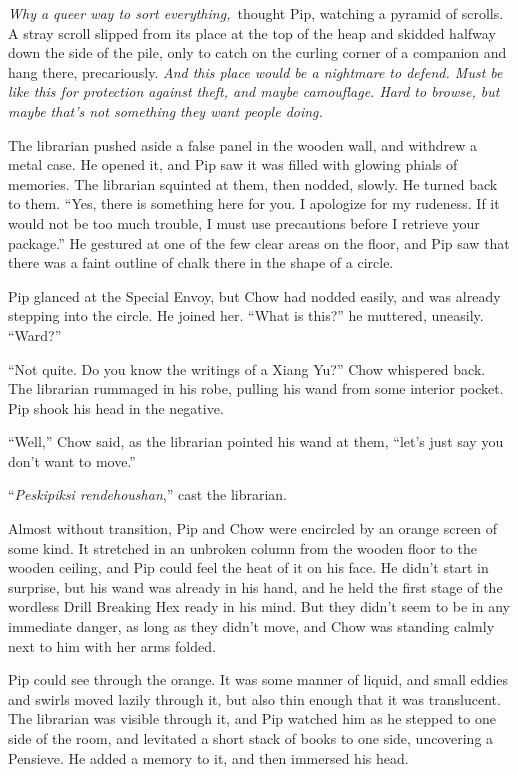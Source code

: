 \emph{Why a queer way to sort everything,}~thought Pip, watching a
pyramid of scrolls. A stray scroll slipped from its place at the top of
the heap and skidded halfway down the side of the pile, only to catch on
the curling corner of a companion and hang there, precariously.
\emph{And this place would be a nightmare to defend. Must be like this
for protection against theft, and maybe camouflage. Hard to browse, but
maybe that's not something they want people doing.}

The librarian pushed aside a false panel in the wooden wall, and
withdrew a metal case. He opened it, and Pip saw it was filled with
glowing phials of memories. The librarian squinted at them, then nodded,
slowly. He turned back to them. ``Yes, there is something here for you.
I apologize for my rudeness. If it would not be too much trouble, I must
use precautions before I retrieve your package.'' He gestured at one of
the few clear areas on the floor, and Pip saw that there was a faint
outline of chalk there in the shape of a circle.

Pip glanced at the Special Envoy, but Chow had nodded easily, and was
already stepping into the circle. He joined her. ``What is this?'' he
muttered, uneasily. ``Ward?''

``Not quite. Do you know the writings of a Xiang Yu?'' Chow whispered
back. The librarian rummaged in his robe, pulling his wand from some
interior pocket. Pip shook his head in the negative.

``Well,'' Chow said, as the librarian pointed his wand at them, ``let's
just say you don't want to move.''

``\emph{Peskipiksi rendehoushan},'' cast the librarian.

Almost without transition, Pip and Chow were encircled by an orange
screen of some kind. It stretched in an unbroken column from the wooden
floor to the wooden ceiling, and Pip could feel the heat of it on his
face. He didn't start in surprise, but his wand was already in his hand,
and he held the first stage of the wordless Drill Breaking Hex ready in
his mind. But they didn't seem to be in any immediate danger, as long as
they didn't move, and Chow was standing calmly next to him with her arms
folded.

Pip could see through the orange. It was some manner of liquid, and
small eddies and swirls moved lazily through it, but also thin enough
that it was translucent. The librarian was visible through it, and Pip
watched him as he stepped to one side of the room, and levitated a short
stack of books to one side, uncovering a Pensieve. He added a memory to
it, and then immersed his head.

